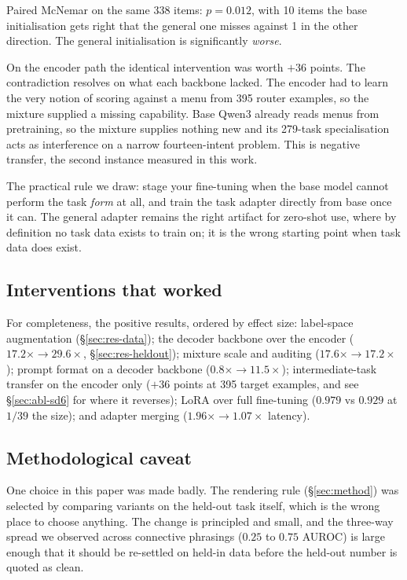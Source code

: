 Paired McNemar on the same 338 items: $p = 0.012$, with 10 items the
base initialisation gets right that the general one misses against 1 in
the other direction. The general initialisation is significantly
\emph{worse}.

On the encoder path the identical intervention was worth $+36$ points.
The contradiction resolves on what each backbone lacked. The encoder had
to learn the very notion of scoring against a menu from 395 router
examples, so the mixture supplied a missing capability. Base Qwen3
already reads menus from pretraining, so the mixture supplies nothing new
and its 279-task specialisation acts as interference on a narrow
fourteen-intent problem. This is negative transfer, the second instance
measured in this work.

The practical rule we draw: stage your fine-tuning when the base model
cannot perform the task \emph{form} at all, and train the task adapter
directly from base once it can. The general adapter remains the right
artifact for zero-shot use, where by definition no task data exists to
train on; it is the wrong starting point when task data does exist.

\subsection{Interventions that worked}

For completeness, the positive results, ordered by effect size: label-space
augmentation (\S\ref{sec:res-data}); the decoder backbone over the encoder
($17.2\times \to 29.6\times$, \S\ref{sec:res-heldout}); mixture scale and
auditing ($17.6\times \to 17.2\times$); prompt format on a decoder backbone
($0.8\times \to 11.5\times$); intermediate-task transfer on the encoder
only ($+36$ points at 395 target examples, and see
\S\ref{sec:abl-sd6} for where it reverses); LoRA over full fine-tuning
($0.979$ vs $0.929$ at $1/39$ the size); and adapter merging
($1.96\times \to 1.07\times$ latency).

\subsection{Methodological caveat}

One choice in this paper was made badly. The \noul{} rendering rule
(\S\ref{sec:method}) was selected by comparing variants on the held-out
task itself, which is the wrong place to choose anything. The change is
principled and small, and the three-way spread we observed across
connective phrasings ($0.25$ to $0.75$ AUROC) is large enough that it
should be re-settled on held-in data before the held-out number is quoted
as clean.
